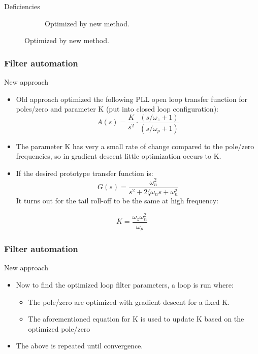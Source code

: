 \documentclass[t, screen, aspectratio=43]{beamer}
\begin{document}
\begin{frame}
\begin{block}{Deficiencies}
\begin{figure}[htb!]
\begin{subfigure}{.4\textwidth}
	            \caption{\scriptsize Optimized by new method.}
	            \label{fig:rosc_3stg_wave}
	        \end{subfigure}
	        \label{fig:rosc_3stg}
	    \end{figure}
	\end{block}
\end{frame}

\begin{frame}
	\frametitle{Filter automation}
	\begin{block}{New approach}
		\begin{itemize}
			\scriptsize
			\item Old approach optimized the following PLL open loop transfer function for poles/zero and parameter K (put into closed loop configuration):
		\scriptsize	
		\begin{equation}
			A(s) = \frac{K}{s^2}\cdot\frac{(s/\omega_z + 1)}{(s/\omega_p + 1)}
		\end{equation}	
			\item The parameter K has very a small rate of change compared to the pole/zero frequencies, so in gradient descent little optimization occurs to K.
			\item If the desired prototype transfer function is:
		\scriptsize	
		\begin{equation}
			G(s) = \frac{\omega_n^2}{s^2 + 2\zeta \omega_n s + \omega_n^2}
		\end{equation}	
		It turns out for the tail roll-off to be the same at high frequency:
		\end{itemize} 
		\scriptsize	
		\begin{equation}
			K = \frac{\omega_z\omega_n^2}{\omega_p}
		\end{equation}	
	\end{block}
\end{frame}

\begin{frame}
	\frametitle{Filter automation}
	\begin{block}{New approach}
		\begin{itemize}
			\scriptsize
			\item Now to find the optimized loop filter parameters, a loop is run where:
			\begin{itemize}
				\tiny
				\item The pole/zero are optimized with gradient descent for a fixed K.
				\item The aforementioned equation for K is used to update K based on the optimized pole/zero
			\end{itemize} 
			\item The above is repeated until convergence.
		\end{itemize}
	\end{block}
\end{frame}
\end{document}
